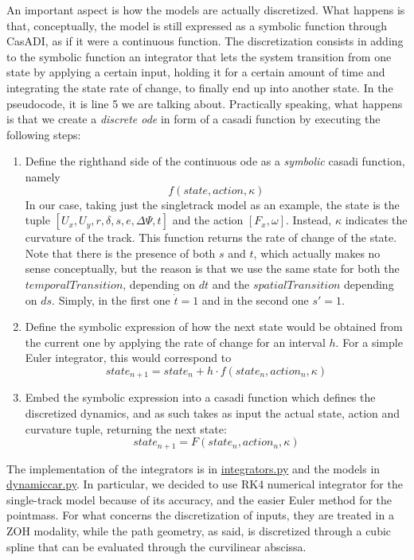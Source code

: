 \documentclass[a4paper, onecolumn, 12pt]{article}
\begin{document}
An important aspect is how the models are actually discretized.  What happens is
that, conceptually, the model is still expressed as a symbolic function through
CasADI, as if it were a continuous function. The discretization consists in
adding to the symbolic function an integrator that lets the system transition
from one state by applying a certain input, holding it for a certain amount of
time and integrating the state rate of change, to finally end up into another
state. In the pseudocode, it is line 5 we are talking about. Practically
speaking, what happens is that we create a \textit{discrete ode} in form of a
casadi function by executing the following steps:
\begin{enumerate}
    \item Define the righthand side of the continuous ode as a \textit{symbolic}
    casadi function, namely \[f(state,action,\kappa)\] In our case, taking just
    the singletrack model as an example, the state is the tuple
    \([U_x,U_y,r,\delta,s,e,\Delta\varPsi,t]\) and the action \([F_x,\omega]\).
    Instead, $\kappa$ indicates the curvature of the track. This function
    returns the rate of change of the state. Note that there is the presence of
    both $s$ and $t$, which actually makes no sense conceptually, but the reason
    is that we use the same state for both the $temporalTransition$, depending
    on $dt$ and the $spatialTransition$ depending on $ds$. Simply, in the first
    one $\dot t=1$ and in the second one $s'=1$.
    \item Define the symbolic expression of how the next state would be obtained
    from the current one by applying the rate of change for an interval $h$. For a
    simple Euler integrator, this would correspond to \[state_{n+1}=state_n+h \cdot f(state_n,action_n,\kappa)\]
    \item Embed the symbolic expression into a casadi function which defines the
    discretized dynamics, and as such takes as input the actual state, action
    and curvature tuple, returning the next state: \[state_{n+1}=F(state_n,action_n,\kappa)\]
\end{enumerate}

The implementation of the integrators is in
\href{https://github.com/neverorfrog/vehicle-control/blob/main/utils/integrators.py}{integrators.py}
and the models in
\href{https://github.com/neverorfrog/vehicle-control/blob/main/models/dynamic_car.py}{dynamiccar.py}.
In particular, we decided to use RK4 numerical integrator for the single-track
model because of its accuracy, and the easier Euler method for the pointmass.
For what concerns the discretization of inputs, they are treated in a ZOH
modality, while the path geometry, as said, is discretized through a cubic
spline that can be evaluated through the curvilinear abscissa.
\end{document}
